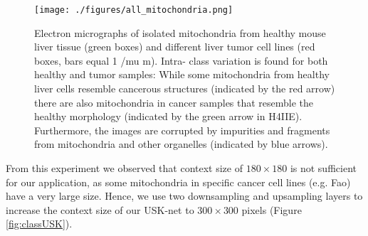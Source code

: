 \begin{figure}[ht!]
\centering
        \texttt{[image: ./figures/all\_mitochondria.png]}
        \caption{Electron micrographs of isolated mitochondria from healthy mouse liver tissue
(green boxes) and different liver tumor cell lines (red boxes, bars equal 1 /mu m). Intra-
class variation is found for both healthy and tumor samples: While some mitochondria
from healthy liver cells resemble cancerous structures (indicated by the red arrow)
there are also mitochondria in cancer samples that resemble the healthy morphology
(indicated by the green arrow in H4IIE). Furthermore, the images are corrupted by
impurities and fragments from mitochondria and other organelles (indicated by blue
arrows).}
        \label{fig:all_mitochondria}
\end{figure}

From this experiment we observed that context size of $180 \times 180 $ is not sufficient for our application, as some
mitochondria in specific cancer cell lines (e.g. Fao) have a very large size. Hence, we use two downsampling and upsampling layers to increase the context size of our USK-net to $300 \times 300$ pixels (Figure \ref{fig:classUSK}). 

